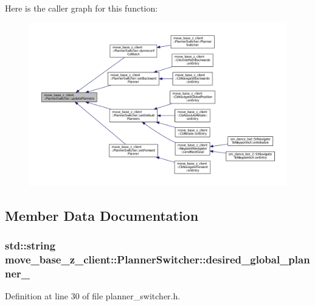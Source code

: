 Here is the caller graph for this function\+:
\nopagebreak
\begin{figure}[H]
\begin{center}
\leavevmode
\includegraphics[width=350pt]{classmove__base__z__client_1_1PlannerSwitcher_a189ac8c027169a111c7d8e14d864752f_icgraph}
\end{center}
\end{figure}




\subsection{Member Data Documentation}
\subsubsection[{\texorpdfstring{desired\+\_\+global\+\_\+planner\+\_\+}{desired_global_planner_}}]{\setlength{\rightskip}{0pt plus 5cm}std\+::string move\+\_\+base\+\_\+z\+\_\+client\+::\+Planner\+Switcher\+::desired\+\_\+global\+\_\+planner\+\_\+\hspace{0.3cm}{\ttfamily [private]}}\hypertarget{classmove__base__z__client_1_1PlannerSwitcher_a004c15858f0a6b9abcd8211d58a7e34c}{}\label{classmove__base__z__client_1_1PlannerSwitcher_a004c15858f0a6b9abcd8211d58a7e34c}


Definition at line 30 of file planner\+\_\+switcher.\+h.



